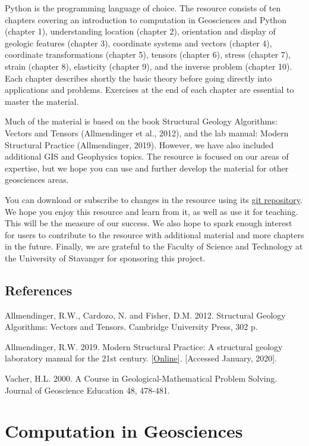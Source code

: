 \documentclass[a4paper , 12pt]{book}
\begin{document}
Python is the programming language of choice. The resource consists of ten chapters covering an introduction to computation in Geosciences and Python (chapter 1), understanding location (chapter 2), orientation and display of geologic features (chapter 3), coordinate systems and vectors (chapter 4), coordinate transformations (chapter 5), tensors (chapter 6), stress (chapter 7), strain (chapter 8), elasticity (chapter 9), and the inverse problem (chapter 10). Each chapter describes shortly the basic theory before going directly into applications and problems. Exercises at the end of each chapter are essential to master the material. 

Much of the material is based on the book Structural Geology Algorithms: Vectors and Tensors (Allmendinger et al., 2012), and the lab manual: Modern Structural Practice (Allmendinger, 2019). However, we have also included additional GIS and Geophysics topics. The resource is focused on our areas of expertise, but we hope you can use and further develop the material for other geosciences areas.

You can download or subscribe to changes in the resource using its \href{https://github.com/nfcd/compGeo}{git repository}. We hope you enjoy this resource and learn from it, as well as use it for teaching. This will be the measure of our success. We also hope to spark enough interest for users to contribute to the resource with additional material and more chapters in the future. Finally, we are grateful to the Faculty of Science and Technology at the University of Stavanger for sponsoring this project.

\section*{References}
Allmendinger, R.W., Cardozo, N. and Fisher, D.M. 2012. Structural Geology Algorithms: Vectors and Tensors. Cambridge University Press, 302 p.

Allmendinger, R.W. 2019. Modern Structural Practice: A structural geology laboratory manual for the 21st century. [\href{http://www.geo.cornell.edu/geology/faculty/RWA/structure-lab-manual}{Online}]. [Accessed January, 2020].

Vacher, H.L. 2000. A Course in Geological-Mathematical Problem Solving. Journal of Geoscience Education 48, 478-481.

\tableofcontents

\chapter{Computation in Geosciences}
\end{document}
